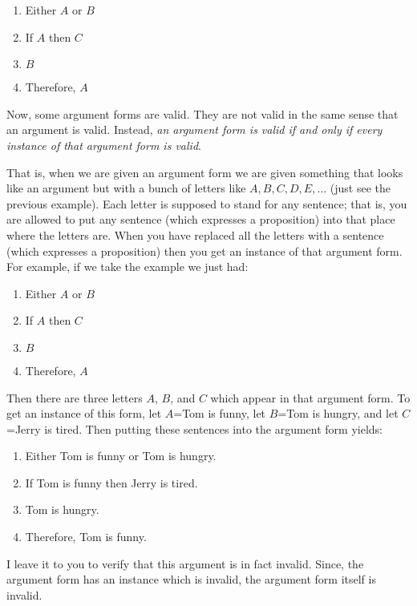 \documentclass[
]{book}
\providecommand{\tightlist}{%
  \setlength{\itemsep}{0pt}\setlength{\parskip}{0pt}}
\begin{document}
\begin{enumerate}
\def\labelenumi{\arabic{enumi}.}
\tightlist
\item
  Either \(A\) or \(B\)
\item
  If \(A\) then \(C\)
\item
  \(B\)
\item
  Therefore, \(A\)
\end{enumerate}

Now, some argument forms are valid. They are not valid in the same sense that an argument is valid. Instead, \emph{an argument form is valid if and only if every instance of that argument form is valid}.

That is, when we are given an argument form we are given something that looks like an argument but with a bunch of letters like \(A,B,C,D,E,\ldots\) (just see the previous example). Each letter is supposed to stand for any sentence; that is, you are allowed to put any sentence (which expresses a proposition) into that place where the letters are. When you have replaced all the letters with a sentence (which expresses a proposition) then you get an instance of that argument form. For example, if we take the example we just had:

\begin{enumerate}
\def\labelenumi{\arabic{enumi}.}
\tightlist
\item
  Either \(A\) or \(B\)
\item
  If \(A\) then \(C\)
\item
  \(B\)
\item
  Therefore, \(A\)
\end{enumerate}

Then there are three letters \(A\), \(B\), and \(C\) which appear in that argument form. To get an instance of this form, let \(A\)=Tom is funny, let \(B\)=Tom is hungry, and let \(C\)=Jerry is tired. Then putting these sentences into the argument form yields:

\begin{enumerate}
\def\labelenumi{\arabic{enumi}.}
\tightlist
\item
  Either Tom is funny or Tom is hungry.
\item
  If Tom is funny then Jerry is tired.
\item
  Tom is hungry.
\item
  Therefore, Tom is funny.
\end{enumerate}

I leave it to you to verify that this argument is in fact invalid. Since, the argument form has an instance which is invalid, the argument form itself is invalid.
\end{document}
